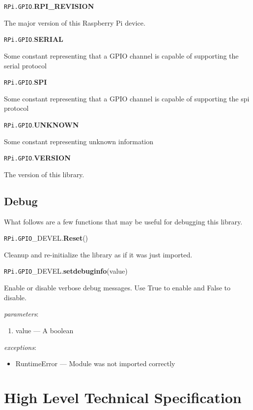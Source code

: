\documentclass[12pt]{article}
\begin{document}
\noindent \texttt{RPi.GPIO}.\textbf{RPI\_REVISION}

The major version of this Raspberry Pi device.

\noindent \texttt{RPi.GPIO}.\textbf{SERIAL}

Some constant representing that a GPIO channel is capable of supporting the serial protocol


\noindent \texttt{RPi.GPIO}.\textbf{SPI}

Some constant representing that a GPIO channel is capable of supporting the spi protocol

\noindent \texttt{RPi.GPIO}.\textbf{UNKNOWN}

Some constant representing unknown information


\noindent \texttt{RPi.GPIO}.\textbf{VERSION}

The version of this library.

\medskip \medskip

\subsection{Debug}

What follows are a few functions that may be useful for debugging this library.

\noindent \texttt{RPi.GPIO}\_DEVEL.\textbf{Reset}()
        
Cleanup and re-initialize the library as if it was just imported.

\noindent \texttt{RPi.GPIO}\_DEVEL.\textbf{setdebuginfo}(value)
        
Enable or disable verbose debug messages. Use True to enable and False to disable.

\textit{parameters}:
\begin{enumerate}      
        \item value --- A boolean
\end{enumerate}
 

\textit{exceptions}:
\begin{itemize}
    \item RuntimeError --- Module was not imported correctly 
\end{itemize}

\section{High Level Technical Specification}
\end{document}
